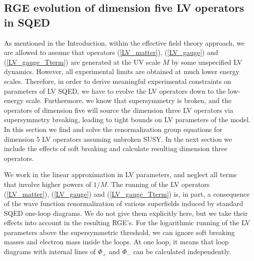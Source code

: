 \documentclass[12pt]{revtex4}
\begin{document}
\subsection{RGE evolution of dimension five LV operators in SQED}
\label{RGEvolution}




As mentioned in the Introduction, within the effective field theory approach, 
we are allowed to assume that operators (\ref{LV_matter}), 
(\ref{LV_gauge}) and (\ref{LV_gauge_Tterm})  
are generated at the UV scale $M$ by some unspecified LV dynamics. 
However, all experimental limits are obtained at much lower energy
scales. Therefore, in order to derive meaningful experimental
constraints on parameters of LV SQED, we have to evolve the LV
operators down to the low-energy scale. Furthermore, we know that
supersymmetry is broken, and the operators of dimension five will
source  the dimension three LV operators via supersymmetry
breaking, leading to tight bounds on LV parameters of the model.
In this section we find and solve the renormalization group equations     
for dimension 5 LV operators assuming unbroken SUSY. In the next
section we include the effects of soft breaking and calculate resulting dimension
three operators. 


We work in the linear approximation in LV parameters, and
neglect all terms that involve higher powers of $1/M$.
The running of the LV operators (\ref{LV_matter}), (\ref{LV_gauge})
and (\ref{LV_gauge_Tterm}) is, in part, a consequence of the wave
function renormalization of various superfields induced by
standard SQED one-loop diagrams. We do not give them explicitly here,
but we take their effects into account in the resulting RGE's. 
For the logarithmic running of the LV parameters above the supersymmetric threshold,
we can ignore soft breaking masses and electron mass inside the loops.  
At one loop, it means that loop diagrams with internal lines of $\Phi_+$ and $\Phi_-$
can be calculated independently.


\end{document}
